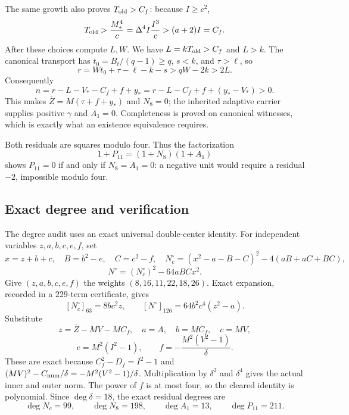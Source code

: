 The same growth also proves $T_{\rm old}>C_f$: because $I\ge c^2$,
\[
 T_{\rm old}>\frac{M_*^4}{c}=\Delta^4I\frac{I^3}{c}>(a+2)I=C_f.
\]
After these choices compute $L,W$. We have $L=kT_{\rm old}>C_f$ and
$L>k$. The canonical transport has $t_0=B_t/(q-1)\ge q$, $s<k$, and
$\tau>\ell$, so
\[
 r=Wt_0+\tau-\ell-k-s>qW-2k>2L.
\]
Consequently
\[
 n=r-L-V_*-C_f+f+y_*=r-L-C_f+f+(y_*-V_*)>0.
\]
This makes $\overline Z=M(\tau+f+y_*)$ and $N_8=0$; the inherited
adaptive carrier supplies positive $\gamma$ and $A_1=0$. Completeness
is proved on canonical witnesses, which is exactly what an existence
equivalence requires.

Both residuals are squares modulo four. Thus the factorization
\[
 1+P_{11}=(1+N_8)(1+A_1)
\]
shows $P_{11}=0$ if and only if $N_8=A_1=0$: a negative unit would
require a residual $-2$, impossible modulo four.

\subsection{Exact degree and verification}

The degree audit uses an exact universal double-center identity. For
independent variables $z,a,b,c,e,f$, set
\[
 x=z+b+c,\quad B=b^2-e,\quad C=c^2-f,\quad
 N_c^\circ=(x^2-a-B-C)^2-4(aB+aC+BC),
\]
\[
 N^\circ=(N_c^\circ)^2-64aBCx^2.
\]
Give $(z,a,b,c,e,f)$ the weights $(8,16,11,22,18,26)$.
Exact expansion, recorded in a $229$-term certificate, gives
\[
 [N_c^\circ]_{63}=8bc^2z,\qquad
 [N^\circ]_{126}=64b^2c^4(z^2-a).
\]
Substitute
\[
 z=\overline Z-MV-MC_f,\quad a=A,\quad b=MC_f,\quad c=MV,
\]
\[
 e=M^2(I^2-1),\qquad f=-\frac{M^2(V^2-1)}\delta.
\]
These are exact because $C_f^2-D_f=I^2-1$ and
$(MV)^2-C_{\rm num}/\delta=-M^2(V^2-1)/\delta$. Multiplication by
$\delta^2$ and $\delta^4$ gives the actual inner and outer norm.
The power of $f$ is at most four, so the cleared identity is polynomial.
Since $\deg\delta=18$, the exact residual degrees are
\[
 \deg N_c=99,\qquad \deg N_8=198,\qquad\deg A_1=13,
 \qquad\deg P_{11}=211.
\]

